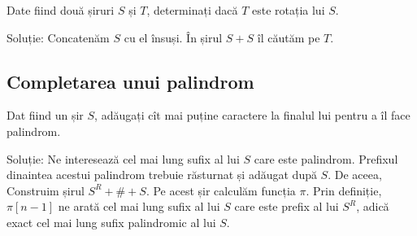 \documentclass[../main.tex]{subfiles}
\begin{document}
Date fiind două șiruri $S$ și $T$, determinați dacă $T$ este rotația lui $S$.

Soluție: Concatenăm $S$ cu el însuși. În șirul $S + S$ îl căutăm pe $T$.

\subsection*{Completarea unui palindrom}

Dat fiind un șir $S$, adăugați cît mai puține caractere la finalul lui pentru a îl face palindrom.

Soluție: Ne interesează cel mai lung sufix al lui $S$ care este palindrom. Prefixul dinaintea acestui palindrom trebuie răsturnat și adăugat după $S$. De aceea, Construim șirul $S^R + \# + S$. Pe acest șir calculăm funcția $\pi$. Prin definiție, $\pi[n - 1]$ ne arată cel mai lung sufix al lui $S$ care este prefix al lui $S^R$, adică exact cel mai lung sufix palindromic al lui $S$.
\end{document}
